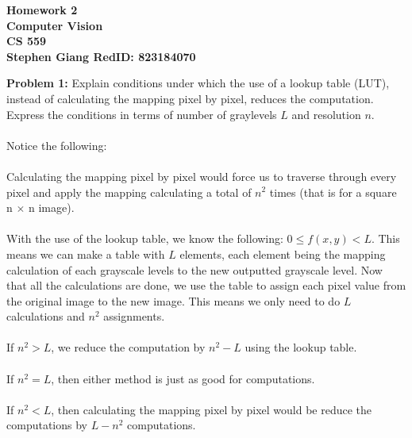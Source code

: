 \documentclass[11pt]{article}
\newcommand{\skipline}{\vspace{\baselineskip}}
\newenvironment{problem}[1]{\textbf{Problem #1: }}{\newpage}
\begin{document}
	
	\begin{center}
		\textbf{Homework 2} \\
		\textbf{Computer Vision} \\
		\textbf{CS 559} \\
		\textbf{Stephen Giang RedID: 823184070} \\
	\end{center}
	\skipline 

	\begin{problem}{1}
		Explain conditions under which the use of a lookup table (LUT), instead of calculating the mapping pixel by pixel, reduces the computation.  Express the conditions in terms of number of graylevels $L$ and resolution $n$. 
		\\ \\
		Notice the following:
		\\ \\
		Calculating the mapping pixel by pixel would force us to traverse through every pixel and apply the mapping calculating a total of $n^2$ times (that is for a square n $\times$ n image).
		\\ \\
		With the use of the lookup table, we know the following: $0 \leq f(x,y) < L$.  This means we can make a table with $L$ elements, each element being the mapping calculation of each grayscale levels to the new outputted grayscale level.  Now that all the calculations are done, we use the table to assign each pixel value from the original image to the new image. This means we only need to do $L$ calculations and $n^2$ assignments.
		\\ \\
		If $n^2 > L$, we reduce the computation by $n^2 - L$ using the lookup table. 
		\\ \\ 
		If $n^2 = L$, then either method is just as good for computations.
		\\ \\
		If $n^2 < L$, then calculating the mapping pixel by pixel would be reduce the computations by $L - n^2$ computations. 
	\end{problem}
\end{document}
